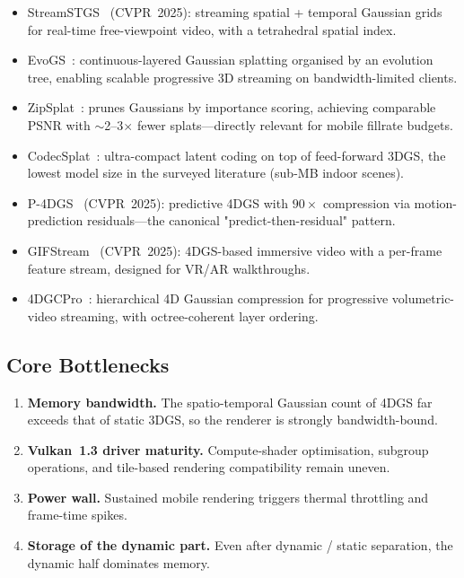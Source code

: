 \begin{itemize}
        4DGS for bandwidth-adaptive streaming, fits a typical
        5G uplink budget by transmitting only the dynamic residual.
  \item StreamSTGS~\cite{ke2025streamstgs} (CVPR~2025): streaming
        spatial + temporal Gaussian grids for real-time
        free-viewpoint video, with a tetrahedral spatial index.
  \item EvoGS~\cite{shi2026evogs}: continuous-layered Gaussian
        splatting organised by an evolution tree, enabling
        scalable progressive 3D streaming on bandwidth-limited
        clients.
  \item ZipSplat~\cite{veicht2026zipsplat}: prunes Gaussians by
        importance scoring, achieving comparable PSNR with
        $\sim$2--3$\times$ fewer splats---directly relevant for
        mobile fillrate budgets.
  \item CodecSplat~\cite{yu2026codecsplat}: ultra-compact latent
        coding on top of feed-forward 3DGS, the lowest model
        size in the surveyed literature (sub-MB indoor scenes).
  \item P-4DGS~\cite{wang2025p4dgs} (CVPR~2025): predictive 4DGS
        with $90\times$ compression via motion-prediction
        residuals---the canonical "predict-then-residual" pattern.
  \item GIFStream~\cite{li2025gifstream} (CVPR~2025): 4DGS-based
        immersive video with a per-frame feature stream, designed
        for VR/AR walkthroughs.
  \item 4DGCPro~\cite{zheng20254dgcpro}: hierarchical 4D Gaussian
        compression for progressive volumetric-video streaming,
        with octree-coherent layer ordering.
\end{itemize}

\subsection{Core Bottlenecks}
\begin{enumerate}
  \item \textbf{Memory bandwidth.} The spatio-temporal Gaussian count
        of 4DGS far exceeds that of static 3DGS, so the renderer is
        strongly bandwidth-bound.
  \item \textbf{Vulkan~1.3 driver maturity.} Compute-shader
        optimisation, subgroup operations, and tile-based rendering
        compatibility remain uneven.
  \item \textbf{Power wall.} Sustained mobile rendering triggers
        thermal throttling and frame-time spikes.
  \item \textbf{Storage of the dynamic part.} Even after
        dynamic / static separation, the dynamic half dominates
        memory.
\end{enumerate}

